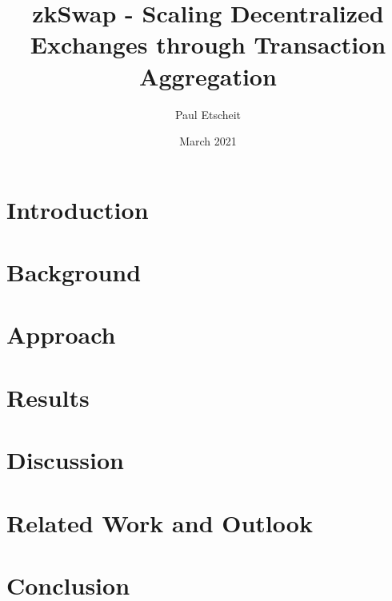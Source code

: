 \documentclass[11pt,twoside,a4paper,final]{book}
\title{zkSwap - Scaling Decentralized Exchanges through Transaction Aggregation}
\author{Paul Etscheit}
\date{March 2021}
\begin{document}
\begin{titlepage}
    \maketitle
\end{titlepage}

\tableofcontents
\section{Introduction}


\section{Background}


\section{Approach}


\section{Results}


\section{Discussion}


\section{Related Work and Outlook}


\section{Conclusion}




\end{document}
